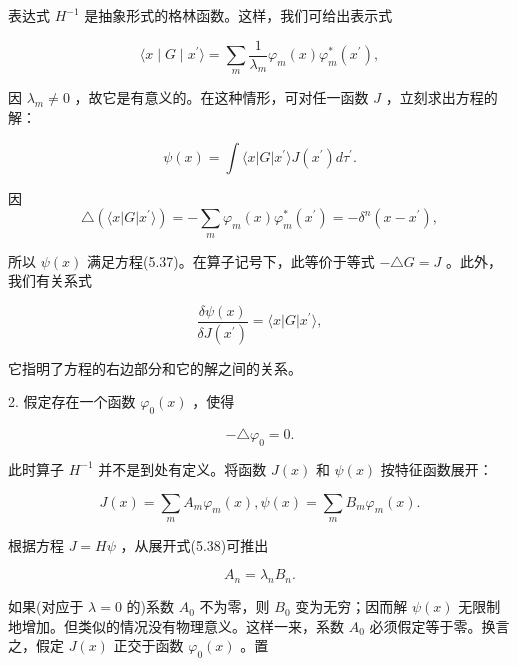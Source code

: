 表达式 $H^{-1}$ 是抽象形式的格林函数。这样，我们可给出表示式

\begin{equation*}
\langle x \mid G \mid x ^ {\prime} \rangle = \sum_ {m} \frac {1}{\lambda_ {m}} \varphi_ {m} (x) \varphi_ {m} ^ {*} (x ^ {\prime}),
\end{equation*}

因 $\lambda_{m} \neq 0$ ，故它是有意义的。在这种情形，可对任一函数 $J$ ，立刻求出方程的解：

\begin{equation*}
\psi (x) = \int \langle x | G | x ^ {\prime} \rangle J (x ^ {\prime}) d \tau^ {\prime}.
\end{equation*}

因
\begin{equation*}
\triangle (\langle x | G | x ^ {\prime} \rangle) = - \sum_ {m} \varphi_ {m} (x) \varphi_ {m} ^ {*} (x ^ {\prime}) = - \delta^ {n} (x - x ^ {\prime}),
\end{equation*}

所以 $\psi(x)$ 满足方程(5.37)。在算子记号下，此等价于等式 $- \triangle G = J$ 。此外，我们有关系式

\begin{equation*}
\frac {\delta \psi (x)}{\delta J \left(x ^ {\prime}\right)} = \langle x | G | x ^ {\prime} \rangle ,
\end{equation*}

它指明了方程的右边部分和它的解之间的关系。

2. 假定存在一个函数 $\varphi_0(x)$ ，使得

\begin{equation*}
- \triangle \varphi_ {0} = 0.
\end{equation*}

此时算子 $H^{-1}$ 并不是到处有定义。将函数 $J(x)$ 和 $\psi (x)$ 按特征函数展开：

\begin{equation*}
J (x) = \sum_ {m} A _ {m} \varphi_ {m} (x), \psi (x) = \sum_ {m} B _ {m} \varphi_ {m} (x).\tag{5.38}
\end{equation*}

根据方程 $J = H \psi$ ，从展开式(5.38)可推出

\begin{equation*}
A _ {n} = \lambda_ {n} B _ {n}.
\end{equation*}

如果(对应于 $\lambda=0$ 的)系数 $A_{0}$ 不为零，则 $B_{0}$ 变为无穷；因而解 $\psi(x)$ 无限制地增加。但类似的情况没有物理意义。这样一来，系数 $A_0$ 必须假定等于零。换言之，假定 $J(x)$ 正交于函数 $\varphi_0(x)$ 。置

